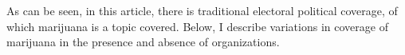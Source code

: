 As can be seen, in this article, there is traditional electoral political coverage, of which marijuana is a topic covered. Below, I describe variations in coverage of marijuana in the presence and absence of organizations. 












